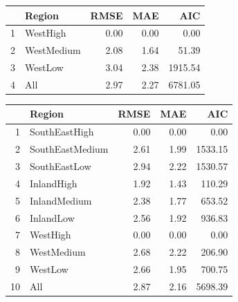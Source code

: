 \documentclass[a4paper,11pt,twoside]{report}
\begin{document}
\begin{table}[ht]
\centering
{} \label{tab:Broad Leaf} 
\begin{tabular}{rlrrr}
  \hline
 & Region & RMSE & MAE & AIC \\ 
  \hline
1 & WestHigh & 0.00 & 0.00 & 0.00 \\ 
  2 & WestMedium & 2.08 & 1.64 & 51.39 \\ 
  3 & WestLow & 3.04 & 2.38 & 1915.54 \\ 
  4 & All & 2.97 & 2.27 & 6781.05 \\ 
   \hline
\end{tabular}
\end{table}
\begin{table}[ht]
\centering
{} \label{tab:Other Spruce} 
\begin{tabular}{rlrrr}
  \hline
 & Region & RMSE & MAE & AIC \\ 
  \hline
1 & SouthEastHigh & 0.00 & 0.00 & 0.00 \\ 
  2 & SouthEastMedium & 2.61 & 1.99 & 1533.15 \\ 
  3 & SouthEastLow & 2.94 & 2.22 & 1530.57 \\ 
  4 & InlandHigh & 1.92 & 1.43 & 110.29 \\ 
  5 & InlandMedium & 2.38 & 1.77 & 653.52 \\ 
  6 & InlandLow & 2.56 & 1.92 & 936.83 \\ 
  7 & WestHigh & 0.00 & 0.00 & 0.00 \\ 
  8 & WestMedium & 2.68 & 2.22 & 206.90 \\ 
  9 & WestLow & 2.66 & 1.95 & 700.75 \\ 
  10 & All & 2.87 & 2.16 & 5698.39 \\ 
   \hline
\end{tabular}
\end{table}
\end{document}

